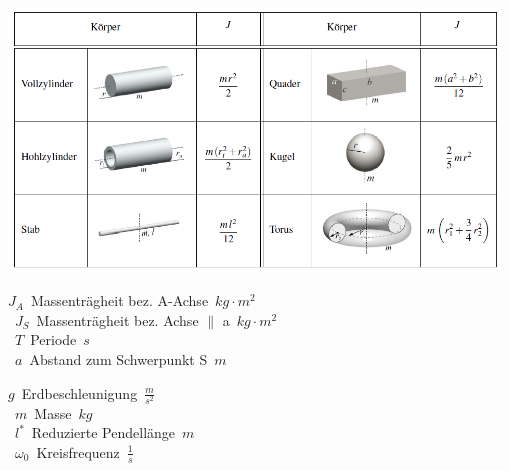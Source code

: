 \begin{center}
	\includegraphics[height=7cm,keepaspectratio=true]{Images/traegheitsmomente.png}
\end{center}
\begin{center}
	\begin{minipage}{0.3\textwidth}
		\unit{$J_A$}{Massenträgheit bez. A-Achse}{$kg \cdot m^2$} \\
		\unit{$J_S$}{Massenträgheit bez. Achse $\parallel$ a}{$kg \cdot m^2$} \\
		\unit{$T$}{Periode}{$s$} \\
		\unit{$a$}{Abstand zum Schwerpunkt S}{$m$} \\
	\end{minipage}%
	\begin{minipage}{0.3\textwidth}
		\unit{$g$}{Erdbeschleunigung}{$\frac{m}{s^2}$} \\
		\unit{$m$}{Masse}{$kg$} \\
		\unit{$l^*$}{Reduzierte Pendellänge}{$m$} \\
		\unit{$\omega_0$}{Kreisfrequenz}{$\frac{1}{s}$} \\
	\end{minipage}
\end{center}




